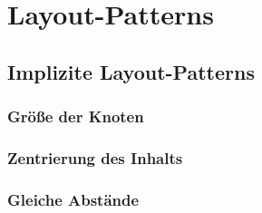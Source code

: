 
\section{Layout-Patterns}




\subsection{Implizite Layout-Patterns}

\subsubsection{Größe der Knoten}
\subsubsection{Zentrierung des Inhalts}
\subsubsection{Gleiche Abstände}
